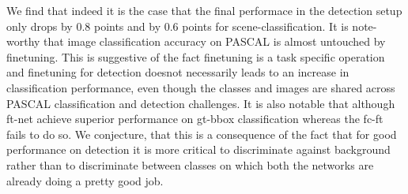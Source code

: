 \documentclass[runningheads]{llncs}
\begin{document}
\setlength{\tabcolsep}{2pt}
\begin{table}
\begin{center}
\caption{Comparison in performance on 4 tasks for 3 network models. (ft-net: finetuned, fc-ft: finetuning fc layers only). For PASCAL tasks we report the mAP and classification accuracy for SUN.}
\label{table:fine-effect}
\end{center}
\end{table}
\setlength{\tabcolsep}{1.4pt}

We find that indeed it is the case that the final performace in the detection setup only drops by 0.8 points and by 0.6 points for scene-classification. It is note-worthy that image classification accuracy on PASCAL is almost untouched by finetuning. This is suggestive of the fact finetuning is a task specific operation and finetuning for detection doesnot necessarily leads to an increase in classification performance, even though the classes and images are shared across PASCAL classification and detection challenges. 
It is also notable that although ft-net achieve superior performance on gt-bbox classification whereas the fc-ft fails to do so. We conjecture, that this is a consequence of the fact that for good performance on detection it is more critical to discriminate against background rather than to discriminate between classes on which both the networks are already doing a pretty good job. 
\end{document}
